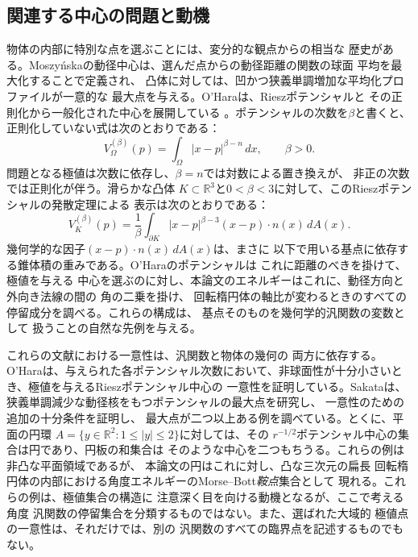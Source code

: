 \subsection{関連する中心の問題と動機}
\label{subsec:related-centers}

物体の内部に特別な点を選ぶことには、変分的な観点からの相当な
歴史がある。Moszy\'nskaの動径中心は、選んだ点からの動径距離の関数の球面
平均を最大化することで定義され、
凸体に対しては、凹かつ狭義単調増加な平均化プロファイルが一意的な
最大点を与える\citep{moszynska2000selectors}。O'Haraは、Rieszポテンシャルと
その正則化から一般化された中心を展開している
\citep{ohara2012renormalization}。ポテンシャルの次数を$\beta$と書くと、
正則化していない式は次のとおりである：
\[
 V_{\Omega}^{(\beta)}(p)
   =\int_{\Omega}|x-p|^{\beta-n}\,dx,\qquad \beta>0.
\]
問題となる極値は次数に依存し、$\beta=n$では対数による置き換えが、
非正の次数では正則化が伴う。滑らかな凸体
$K\subset\mathbb R^3$と$0<\beta<3$に対して、このRieszポテンシャルの発散定理による
表示は次のとおりである：
\[
 V_{K}^{(\beta)}(p)
  =\frac{1}{\beta}\int_{\partial K}|x-p|^{\beta-3}
       (x-p)\cdot n(x)\,dA(x).
\]
幾何学的な因子$(x-p)\cdot n(x)\,dA(x)$は、まさに
以下で用いる基点に依存する錐体積の重みである。O'Haraのポテンシャルは
これに距離のべきを掛けて、極値を与える
中心を選ぶのに対し、本論文のエネルギーはこれに、動径方向と外向き法線の間の
角の二乗を掛け、
回転楕円体の軸比が変わるときのすべての停留成分を調べる。これらの構成は、
基点そのものを幾何学的汎関数の変数として
扱うことの自然な先例を与える。

これらの文献における一意性は、汎関数と物体の幾何の
両方に依存する。O'Haraは、与えられた各ポテンシャル次数において、非球面性が十分小さいとき、極値を与えるRieszポテンシャル中心の
一意性を証明している\citep{ohara2022nearly}。Sakataは、
狭義単調減少な動径核をもつポテンシャルの最大点を研究し、
一意性のための追加の十分条件を証明し、
最大点が二つ以上ある例を調べている\citep{sakata2016uniqueness}。とくに、平面の円環
$A=\{y\in\mathbb R^2:1\leq|y|\leq2\}$に対しては、その
$r^{-1/2}$ポテンシャル中心の集合は円であり、円板の和集合は
そのような中心を二つもちうる。これらの例は非凸な平面領域であるが、
本論文の円はこれに対し、凸な三次元の扁長
回転楕円体の内部における角度エネルギーのMorse--Bott\emph{鞍点}集合として
現れる。これらの例は、極値集合の構造に
注意深く目を向ける動機となるが、ここで考える角度
汎関数の停留集合を分類するものではない。また、選ばれた大域的
極値点の一意性は、それだけでは、別の
汎関数のすべての臨界点を記述するものでもない。

